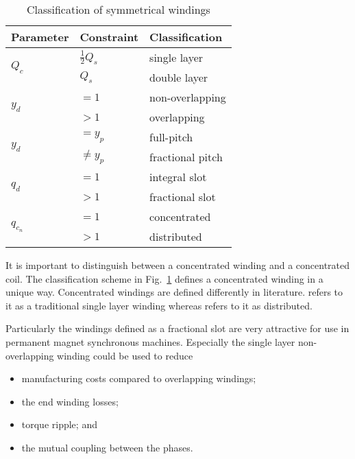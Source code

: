 {\renewcommand{\arraystretch}{1.2}
\begin{table}[htbp]
  \centering
  \caption{Classification of symmetrical windings}
	\label{fig:classification}
  \begin{tabular}{|l|l|l|}
  \hline
  Parameter  & Constraint  &  Classification  \\
  \hline
  \multirow{2}{*}{$Q_c$} & $\frac{1}{2}Q_s$ & single layer \\
                         & $Q_s$            & double layer \\
  \hline                        
  \multirow{2}{*}{$y_d$} & $=1$  & non-overlapping         \\
                         & $>1$  & overlapping             \\
  \hline                         
  \multirow{2}{*}{$y_d$} & $=y_p$     & full-pitch         \\
                         & $\neq y_p$ & fractional pitch   \\
  \hline                         
  \multirow{2}{*}{$q_d$} & $=1$     & integral slot        \\
                         & $>1$     & fractional slot      \\
  \hline                         
  \multirow{2}{*}{$q_{c_n}$} & $=1$     & concentrated     \\
                             & $>1$     & distributed      \\  
  \hline
  \end{tabular}
\end{table}}

It is important to distinguish between a concentrated winding and a concentrated coil. The classification scheme in Fig.~\ref{fig:classification} defines a concentrated winding in a unique way. Concentrated windings are defined differently in literature. \cite{REF-00814} refers to it as a traditional single layer winding whereas \cite{REF-00822} refers to it as distributed.

Particularly the windings defined as a fractional slot are very attractive for use in permanent magnet synchronous machines. Especially the single layer non-overlapping winding could be used to reduce
\begin{itemize}
	\item manufacturing costs compared to overlapping windings;
	\item the end winding losses;
	\item torque ripple; and
	\item the mutual coupling between the phases.
\end{itemize}


